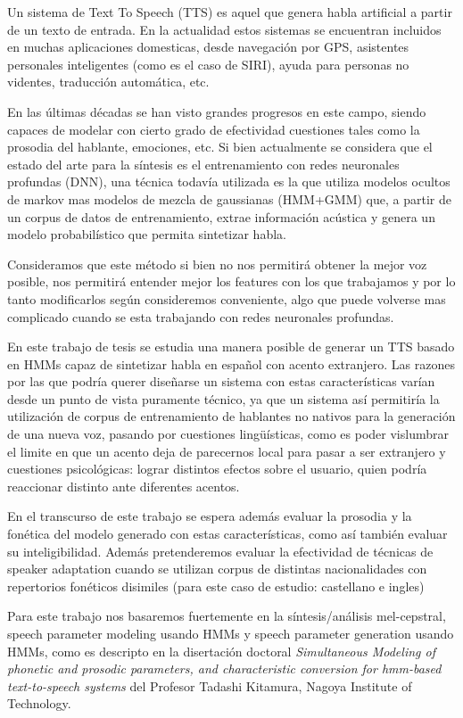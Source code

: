 
\noindent Un sistema de Text To Speech (TTS) es aquel que genera habla artificial a partir de un texto de entrada. En la actualidad estos sistemas se encuentran incluidos en muchas aplicaciones domesticas, desde navegación por GPS, asistentes personales inteligentes (como es el caso de SIRI), ayuda para personas no videntes, traducción automática, etc.

\noindent En las últimas décadas se han visto grandes progresos en este campo, siendo capaces de modelar con cierto grado de efectividad cuestiones tales como la prosodia del hablante, emociones, etc. Si bien actualmente se considera que el estado del arte para la síntesis es el entrenamiento con redes neuronales profundas (DNN), una técnica todavía utilizada es la que utiliza modelos ocultos de markov mas modelos de mezcla de gaussianas (HMM+GMM) que, a partir de un corpus de datos de entrenamiento, extrae información acústica y genera un modelo probabilístico que permita sintetizar habla. 

Consideramos que este método si bien no nos permitirá obtener la mejor voz posible, nos permitirá entender mejor los features con los que trabajamos y por lo tanto modificarlos según consideremos conveniente, algo que puede volverse mas complicado cuando se esta trabajando con redes neuronales profundas.

\noindent En este trabajo de tesis se estudia una manera posible de generar un TTS basado en HMMs capaz de sintetizar habla en español con acento extranjero. Las razones por las que podría querer diseñarse un sistema con estas características varían desde un punto de vista puramente técnico, ya que un sistema así permitiría la utilización de corpus de entrenamiento de hablantes no nativos para la generación de una nueva voz, pasando por cuestiones lingüísticas, como es poder vislumbrar el limite en que un acento deja de parecernos local para pasar a ser extranjero y cuestiones psicológicas: lograr distintos efectos sobre el usuario, quien podría reaccionar distinto ante diferentes acentos.

\noindent En el transcurso de este trabajo se espera además evaluar la prosodia y la fonética del modelo generado con estas características, como así también evaluar su inteligibilidad. Además pretenderemos evaluar la efectividad de técnicas de speaker adaptation cuando se utilizan corpus de distintas nacionalidades con repertorios fonéticos disimiles (para este caso de estudio: castellano e ingles)

\noindent Para este trabajo nos basaremos fuertemente en la síntesis/análisis mel-cepstral, speech parameter modeling usando HMMs y speech parameter generation usando HMMs, como es descripto en la disertación doctoral \textit{Simultaneous Modeling of phonetic and prosodic parameters, and characteristic conversion for hmm-based text-to-speech systems} del Profesor Tadashi Kitamura, Nagoya Institute of Technology\cite{phoneticAndProsodic}.


